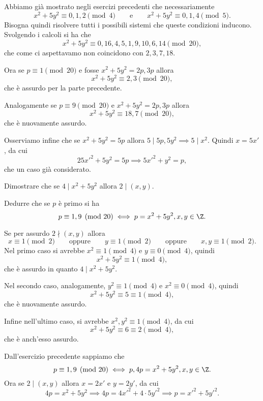 \begin{sol}
	Abbiamo già mostrato negli esercizi precedenti che necessariamente
	\[
		x^2+5y^2 \equiv 0,1,2 \pmod{4} \qquad\text{e}\qquad x^2+5y^2 \equiv 0,1,4 \pmod{5}.
	\]
	Bisogna quindi risolvere tutti i possibili sistemi che queste condizioni inducono.
	Svolgendo i calcoli si ha che
	\[
		x^2+5y^2 \equiv 0,16,4,5,1,9,10,6,14 \pmod{20},
	\]
	che come ci aspettavamo non coincidono con \(2,3,7,18\).

	Ora se \(p\equiv 1 \pmod{20}\) e fosse \(x^2+5y^2 = 2p,3p\) allora
	\[
		x^2+5y^2 \equiv 2,3\pmod{20},
	\]
	che è assurdo per la parte precedente.

	Analogamente se \(p\equiv 9 \pmod{20}\) e \(x^2+5y^2 = 2p,3p\) allora
	\[
		x^2+5y^2 \equiv 18,7 \pmod{20},
	\]
	che è nuovamente assurdo.

	Osserviamo infine che se \(x^2+5y^2 =5p\) allora \(5 \mid 5p,5y^2 \implies 5\mid x^2\).
	Quindi \(x=5x'\), da cui
	\[
		25x'^2 + 5y^2 = 5p \implies 5x'^2+y^2=p,
	\]
	che un caso già considerato.
\end{sol}

\begin{exeL}\label{ex:esonero3d}
	Dimostrare che se \(4\mid x^2+5y^2\) allora \(2\mid(x,y)\).

	Dedurre che se \(p\) è primo si ha
	\[
		p\equiv 1,9 \pmod{20} \iff p = x^2+5y^2,x,y\in\Z.
	\]
\end{exeL}

\begin{sol}
	Se per assurdo \(2\nmid (x,y)\) allora
	\[
		x\equiv 1 \pmod{2} \qquad\text{oppure}\qquad y\equiv 1 \pmod{2} \qquad\text{oppure}\qquad x,y\equiv 1 \pmod{2}.
	\]
	Nel primo caso si avrebbe \(x^2 \equiv 1 \pmod{4}\) e \(y\equiv 0 \pmod{4}\), quindi
	\[
		x^2+5y^2 \equiv 1 \pmod{4},
	\]
	che è assurdo in quanto \(4\mid x^2+5y^2\).

	Nel secondo caso, analogamente, \(y^2 \equiv 1 \pmod{4}\) e \(x^2 \equiv 0 \pmod{4}\), quindi
	\[
		x^2+5y^2 \equiv 5 \equiv 1 \pmod{4},
	\]
	che è nuovamente assurdo.

	Infine nell'ultimo caso, si avrebbe \(x^2,y^2 \equiv 1 \pmod{4}\), da cui
	\[
		x^2+5y^2 \equiv 6 \equiv 2 \pmod{4},
	\]
	che è anch'esso assurdo.

	Dall'esercizio precedente sappiamo che
	\[
		p\equiv 1,9 \pmod{20} \iff p,4p = x^2+5y^2,x,y\in\Z.
	\]
	Ora se \(2\mid(x,y)\) allora \(x=2x'\) e \(y=2y'\), da cui
	\[
		4p = x^2+5y^2 \implies 4p = 4x'^2+4\cdot 5y'^2 \implies p=x'^2+5y'^2.
	\]
\end{sol}

